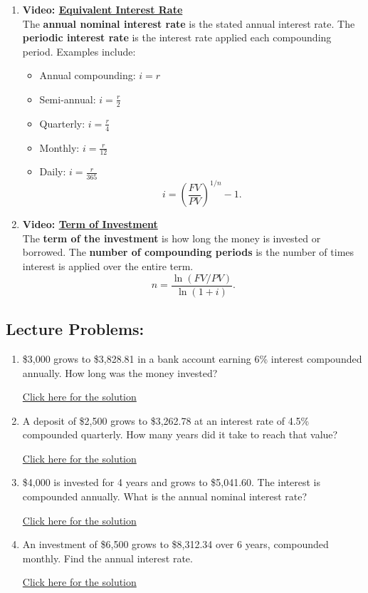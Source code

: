 \documentclass[
]{book}
\providecommand{\tightlist}{%
  \setlength{\itemsep}{0pt}\setlength{\parskip}{0pt}}
\begin{document}
\begin{enumerate}
\def\labelenumi{\arabic{enumi}.}
\tightlist
\item
  \textbf{Video: \href{https://youtu.be/n2Z1aLFtaiE}{Equivalent Interest Rate}}\\
  The \textbf{annual nominal interest rate} is the stated annual interest rate. The \textbf{periodic interest rate} is the interest rate applied each compounding period. Examples include:

  \begin{itemize}
  \tightlist
  \item
    Annual compounding: \(i = r\)
  \item
    Semi-annual: \(i = \frac{r}{2}\)
  \item
    Quarterly: \(i = \frac{r}{4}\)
  \item
    Monthly: \(i = \frac{r}{12}\)
  \item
    Daily: \(i = \frac{r}{365}\)
    \[
     i = \left(\dfrac{FV}{PV} \right)^{1/n} - 1.
     \]
  \end{itemize}
\item
  \textbf{Video: \href{https://youtu.be/rfa1WBzjMaY}{Term of Investment}}\\
  The \textbf{term of the investment} is how long the money is invested or borrowed. The \textbf{number of compounding periods} is the number of times interest is applied over the entire term.\\
  \[
   n = \dfrac{\ln(FV/PV)}{\ln(1+i)}.
   \]
\end{enumerate}

\subsection*{Lecture Problems:}\label{lecture-problems-10}

\begin{enumerate}
\def\labelenumi{\arabic{enumi}.}
\tightlist
\item
  \$3,000 grows to \$3,828.81 in a bank account earning 6\% interest compounded annually. How long was the money invested?

  \href{https://youtu.be/ala74SWNy-Y}{Click here for the solution}
\item
  A deposit of \$2,500 grows to \$3,262.78 at an interest rate of 4.5\% compounded quarterly. How many years did it take to reach that value?

  \href{https://youtu.be/FTwVwzi5Nf0}{Click here for the solution}
\item
  \$4,000 is invested for 4 years and grows to \$5,041.60. The interest is compounded annually. What is the annual nominal interest rate?

  \href{https://youtu.be/3plLnxnEtHU}{Click here for the solution}
\item
  An investment of \$6,500 grows to \$8,312.34 over 6 years, compounded monthly. Find the annual interest rate.

  \href{https://youtu.be/fnOVWqeE4gI}{Click here for the solution}
\end{enumerate}
\end{document}
